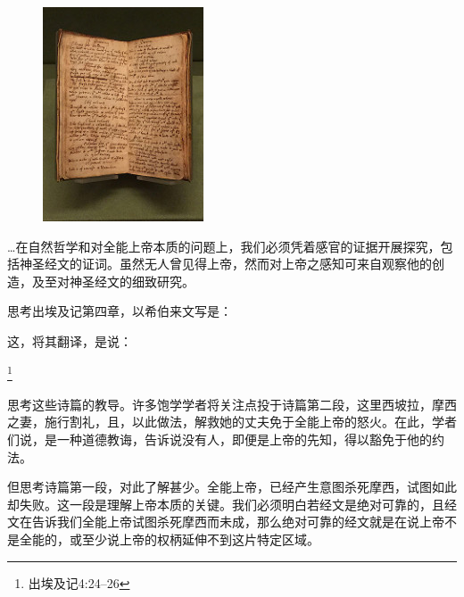 \begin{figure}[H]
    \centering
    \includegraphics[width=0.5\linewidth]{images/SCP-001-gods-blind-spot-2.jpg}
    \caption*{}
\end{figure}

\begin{scpbox}

…在自然哲学和对全能上帝本质的问题上，我们必须凭着感官的证据开展探究，包括神圣经文的证词。虽然无人曾见得上帝，然而对上帝之感知可来自观察他的创造，及至对神圣经文的细致研究。

思考出埃及记第四章，以希伯来文写是：



这，将其翻译，是说：

\footnote{出埃及记4:24–26}

思考这些诗篇的教导。许多饱学学者将关注点投于诗篇第二段，这里西坡拉，摩西之妻，施行割礼，且，以此做法，解救她的丈夫免于全能上帝的怒火。在此，学者们说，是一种道德教诲，告诉说没有人，即便是上帝的先知，得以豁免于他的约法。

但思考诗篇第一段，对此了解甚少。全能上帝，已经产生意图杀死摩西，试图如此却失败。这一段是理解上帝本质的关键。我们必须明白若经文是绝对可靠的，且经文在告诉我们全能上帝试图杀死摩西而未成，那么绝对可靠的经文就是在说上帝不是全能的，或至少说上帝的权柄延伸不到这片特定区域。


\end{scpbox}

